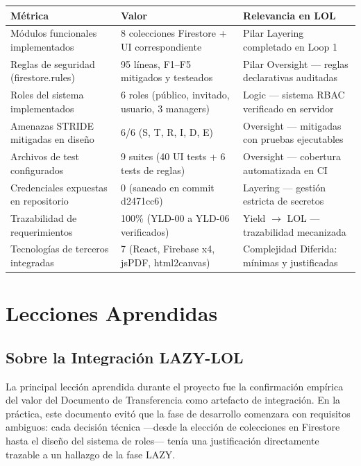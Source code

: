 \documentclass[14pt,a4paper,oneside]{extbook}
\begin{document}
\begin{table}[htbp]
\centering
\begin{tabular}{p{} p{} p{}}
\toprule
\textbf{Métrica} & \textbf{Valor} & \textbf{Relevancia en LOL} \\
\midrule
Módulos funcionales implementados & 8 colecciones Firestore + UI correspondiente & Pilar Layering completado en Loop 1 \\
Reglas de seguridad (firestore.rules) & 95 líneas, F1–F5 mitigados y testeados & Pilar Oversight — reglas declarativas auditadas \\
Roles del sistema implementados & 6 roles (público, invitado, usuario, 3 managers) & Logic — sistema RBAC verificado en servidor \\
Amenazas STRIDE mitigadas en diseño & 6/6 (S, T, R, I, D, E) & Oversight — mitigadas con pruebas ejecutables \\
Archivos de test configurados & 9 suites (40 UI tests + 6 tests de reglas) & Oversight — cobertura automatizada en CI \\
Credenciales expuestas en repositorio & 0 (saneado en commit d2471cc6) & Layering — gestión estricta de secretos \\
Trazabilidad de requerimientos & 100\% (YLD-00 a YLD-06 verificados) & Yield $\rightarrow$ LOL — trazabilidad mecanizada \\
Tecnologías de terceros integradas & 7 (React, Firebase x4, jsPDF, html2canvas) & Complejidad Diferida: mínimas y justificadas \\
\bottomrule
\end{tabular}
\end{table}






\section{Lecciones Aprendidas}

\subsection{Sobre la Integración LAZY-LOL}

La principal lección aprendida durante el proyecto fue la confirmación empírica del valor del Documento de Transferencia como artefacto de integración. En la práctica, este documento evitó que la fase de desarrollo comenzara con requisitos ambiguos: cada decisión técnica ---desde la elección de colecciones en Firestore hasta el diseño del sistema de roles--- tenía una justificación directamente trazable a un hallazgo de la fase LAZY.
\end{document}
